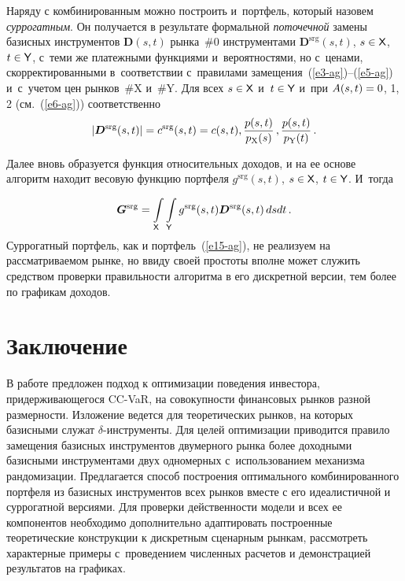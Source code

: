 \begin{multicols}{2}
  Наряду с комбинированным можно построить и~портфель, который назовем 
\textit{суррогатным}. Он получается в результате формальной 
\textit{поточечной} замены базисных инструментов $\boldsymbol{D}(s,t)$ 
рынка~\#0 инструментами $\boldsymbol{D}^{\mathrm{srg}}(s, t)$, $s \hm\in {\sf X}$, $t 
\hm\in {\sf Y}$, с~теми же платежными функциями и~вероятностями, но 
с~ценами, скорректированными в~соответствии с~правилами 
замещения~(\ref{e3-ag})--(\ref{e5-ag}) и~с~учетом цен рынков~\#X и~\#Y. Для 
всех $s\hm\in {\sf X}$ и~$t\hm\in {\sf Y}$ и~при $A(s, t)\hm = 0$, 1, 2 
(см.~(\ref{e6-ag})) соответственно 
  $$
  \left\vert \boldsymbol{D}^{\mathrm{srg}}(s,t)\right\vert =c^{\mathrm{srg}} (s,t) =c(s,t), 
\displaystyle\frac{\displaystyle p(s,t)\mathstrut}{\displaystyle p_{\mathrm{X}}(s)\mathstrut}\,, \displaystyle\frac{\displaystyle p(s,t)\mathstrut}{\displaystyle p_{\mathrm{Y}}(t)\mathstrut}\,.
  $$

  
  Далее вновь образуется функция относительных доходов, и на ее основе 
алгоритм находит весовую функцию портфеля $g^{\mathrm{srg}}(s, t)$, $s \hm\in {\sf X}$, 
$t \hm\in {\sf Y}$. И~тогда

\noindent
  $$
  \boldsymbol{G}^{\mathrm{srg}}=\int\limits_{\sf X} \int\limits_{\sf Y} g^{\mathrm{srg}}(s,t) 
\boldsymbol{D}^{\mathrm{srg}}(s,t)\,dsdt\,.
  $$
  Суррогатный портфель, как и портфель~(\ref{e15-ag}), не реализуем на 
рассматриваемом рынке, но ввиду своей простоты вполне может служить 
средством проверки правильности алгоритма в его дискретной версии, тем 
более по графикам доходов.

\vspace*{-6pt}
  
  \section{Заключение}
  
  В работе предложен подход к оптимизации поведения инвестора, 
придерживающегося CC-VaR, на совокупности финансовых рынков разной 
размерности. Изложение ведется для теоретических рынков, на которых 
базисными служат $\delta$-ин\-стру\-мен\-ты. Для целей оптимизации 
приводится правило замещения базисных инструментов двумерного рынка 
более доходными базисными инструментами двух одномерных 
с~использованием механизма рандомизации. Предлагается способ построения 
оптимального комбинированного портфеля из базисных инструментов всех 
рынков вместе с его идеалистичной и суррогатной версиями. Для проверки 
действенности модели и всех ее компонентов необходимо дополнительно 
адаптировать построенные теоретические конструкции к дискретным 
сценарным рынкам, рассмотреть характерные примеры с~проведением 
численных расчетов и демонстрацией результатов на графиках. 


\end{multicols}
